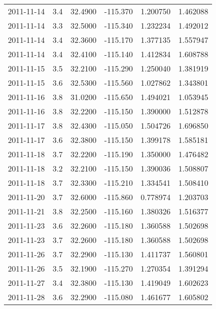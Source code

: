 \begin{tabular}{lrrrrr}
2011-11-14 &       3.4 &  32.4900 &  -115.370 &         1.200750 &         1.462088 \\
2011-11-14 &       3.3 &  32.5000 &  -115.340 &         1.232234 &         1.492012 \\
2011-11-14 &       3.4 &  32.3600 &  -115.170 &         1.377135 &         1.557947 \\
2011-11-14 &       3.4 &  32.4100 &  -115.140 &         1.412834 &         1.608788 \\
2011-11-15 &       3.5 &  32.2100 &  -115.290 &         1.250040 &         1.381919 \\
2011-11-15 &       3.6 &  32.5300 &  -115.560 &         1.027862 &         1.343801 \\
2011-11-16 &       3.8 &  31.0200 &  -115.650 &         1.494021 &         1.053945 \\
2011-11-16 &       3.8 &  32.2200 &  -115.150 &         1.390000 &         1.512878 \\
2011-11-17 &       3.8 &  32.4300 &  -115.050 &         1.504726 &         1.696850 \\
2011-11-17 &       3.6 &  32.3800 &  -115.150 &         1.399178 &         1.585181 \\
2011-11-18 &       3.7 &  32.2200 &  -115.190 &         1.350000 &         1.476482 \\
2011-11-18 &       3.2 &  32.2100 &  -115.150 &         1.390036 &         1.508807 \\
2011-11-18 &       3.7 &  32.3300 &  -115.210 &         1.334541 &         1.508410 \\
2011-11-20 &       3.7 &  32.6000 &  -115.860 &         0.778974 &         1.203703 \\
2011-11-21 &       3.8 &  32.2500 &  -115.160 &         1.380326 &         1.516377 \\
2011-11-23 &       3.6 &  32.2600 &  -115.180 &         1.360588 &         1.502698 \\
2011-11-23 &       3.7 &  32.2600 &  -115.180 &         1.360588 &         1.502698 \\
2011-11-26 &       3.7 &  32.2900 &  -115.130 &         1.411737 &         1.560801 \\
2011-11-26 &       3.5 &  32.1900 &  -115.270 &         1.270354 &         1.391294 \\
2011-11-27 &       3.4 &  32.3800 &  -115.130 &         1.419049 &         1.602623 \\
2011-11-28 &       3.6 &  32.2900 &  -115.080 &         1.461677 &         1.605802 \\

\end{tabular}
